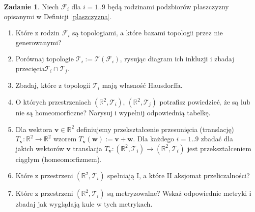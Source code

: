 \documentclass{article}
\theoremstyle{definition}%
\theoremstyle{theorem}
\newtheorem{zad}{Zadanie}
\newcommand{\R}{\mathbb{R}} %
\newcommand{\sT}{\mathcal{T}} %
\newcommand{\sF}{\mathcal{F}} %
\newcommand{\vv}{\mathbf{v}}
\newcommand{\ww}{\mathbf{w}}
\begin{document}
\begin{zad}
Niech $\sF_i$ dla $i=1..9$ będą rodzinami podzbiorów płaszczyzny  opisanymi w Definicji \ref{plaszczyzna}.
\begin{enumerate}%
\item Które z rodzin $\sF_i$ są topologiami, a które bazami topologii przez nie generowanymi?
\item Porównaj topologie  $\sT_i := \sT (\sF_i)$, rysując diagram ich inkluzji  i zbadaj przecięcia$\sT_i\cap\sT_j$.
\item Zbadaj, które z topologii   $\sT_i $ mają własność Hausdorffa.
\item O których przestrzeniach $(\R^2 ,\sT_i),\, (\R^2 ,\sT_j)$ potrafisz powiedzieć, że są lub nie są homeomorficzne? Narysuj i wypełnij odpowiednią tabelkę. %
\item Dla wektora $\vv\in\R^2$ definiujemy przekształcenie przesunięcia (translację) $T_\vv:\R^2\to\R^2$ wzorem $T_\vv(\ww):=\vv+\ww.$ Dla każdego $i=1..9$ zbadać dla jakich wektorów $\vv$ translacja \hbox{$T_\vv\colon (\R^2,\sT_i)\to (\R^2,\sT_i)$} jest przekształceniem ciągłym (homeomorfizmem).
\item Które z przestrzeni $(\R^2 ,\sT_i)$ spełniają I, a które II aksjomat przeliczalności?
\item Które z przestrzeni $(\R^2 ,\sT_i)$  są metryzowalne? Wskaż odpowiednie metryki i zbadaj jak wyglądają kule w tych metrykach.  %
\end{enumerate}
\end{zad}
\end{document}
